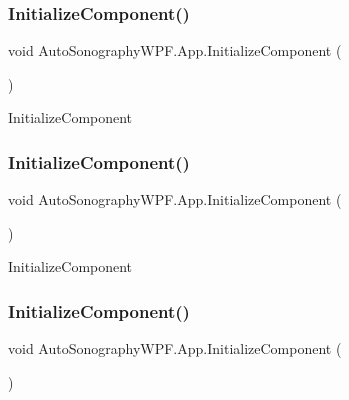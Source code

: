 \subsubsection{\texorpdfstring{Initialize\+Component()}{InitializeComponent()}\hspace{0.1cm}{\footnotesize\ttfamily [1/4]}}
{\footnotesize\ttfamily void Auto\+Sonography\+W\+P\+F.\+App.\+Initialize\+Component (\begin{DoxyParamCaption}{ }\end{DoxyParamCaption})}



Initialize\+Component 

\hypertarget{class_auto_sonography_w_p_f_1_1_app_a5878d4ccc5b6d4f1343b839cfa9babbb}{}\label{class_auto_sonography_w_p_f_1_1_app_a5878d4ccc5b6d4f1343b839cfa9babbb} 
\subsubsection{\texorpdfstring{Initialize\+Component()}{InitializeComponent()}\hspace{0.1cm}{\footnotesize\ttfamily [2/4]}}
{\footnotesize\ttfamily void Auto\+Sonography\+W\+P\+F.\+App.\+Initialize\+Component (\begin{DoxyParamCaption}{ }\end{DoxyParamCaption})}



Initialize\+Component 

\hypertarget{class_auto_sonography_w_p_f_1_1_app_a5878d4ccc5b6d4f1343b839cfa9babbb}{}\label{class_auto_sonography_w_p_f_1_1_app_a5878d4ccc5b6d4f1343b839cfa9babbb} 
\subsubsection{\texorpdfstring{Initialize\+Component()}{InitializeComponent()}\hspace{0.1cm}{\footnotesize\ttfamily [3/4]}}
{\footnotesize\ttfamily void Auto\+Sonography\+W\+P\+F.\+App.\+Initialize\+Component (\begin{DoxyParamCaption}{ }\end{DoxyParamCaption})}



